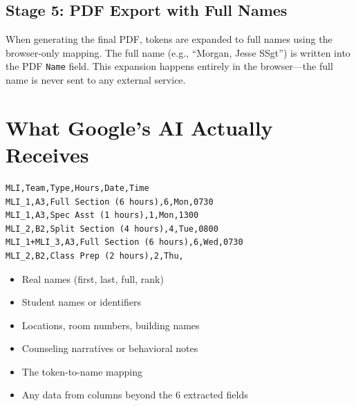 \documentclass[11pt,letterpaper]{article}
\begin{document}
\begin{center}
\end{center}

\subsection{Stage 5: PDF Export with Full Names}

When generating the final PDF, tokens are expanded to full names using the browser-only mapping. The full name (e.g., ``Morgan, Jesse SSgt'') is written into the PDF \texttt{Name} field. This expansion happens entirely in the browser---the full name is never sent to any external service.

\section{What Google's AI Actually Receives}

\begin{tcolorbox}[warnstyle, title={Exact Data Sent to Gemini 2.5 Flash}]
\begin{verbatim}
MLI,Team,Type,Hours,Date,Time
MLI_1,A3,Full Section (6 hours),6,Mon,0730
MLI_1,A3,Spec Asst (1 hours),1,Mon,1300
MLI_2,B2,Split Section (4 hours),4,Tue,0800
MLI_1+MLI_3,A3,Full Section (6 hours),6,Wed,0730
MLI_2,B2,Class Prep (2 hours),2,Thu,
\end{verbatim}
\end{tcolorbox}

\begin{tcolorbox}[safestyle, title={What Google Does NOT Receive}]
\begin{itemize}[nosep,leftmargin=*]
  \item Real names (first, last, full, rank)
  \item Student names or identifiers
  \item Locations, room numbers, building names
  \item Counseling narratives or behavioral notes
  \item The token-to-name mapping
  \item Any data from columns beyond the 6 extracted fields
\end{itemize}
\end{tcolorbox}
\end{document}
